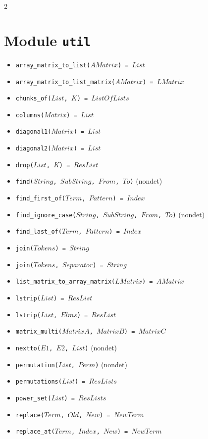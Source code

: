 \documentclass[10pt]{article}
\begin{document}
\begin{multicols}{2}
\section*{Module \texttt{util}}
\begin{scriptsize}
\begin{itemize}
    \item \texttt{array\_matrix\_to\_list($AMatrix$) = $List$}
    \item \texttt{array\_matrix\_to\_list\_matrix($AMatrix$) = $LMatrix$}
    \item \texttt{chunks\_of($List$, $K$) = $ListOfLists$}
    \item \texttt{columns($Matrix$) = $List$}
    \item \texttt{diagonal1($Matrix$) = $List$}
    \item \texttt{diagonal2($Matrix$) = $List$}
    \item \texttt{drop($List$, $K$) = $ResList$}
    \item \texttt{find($String$, $SubString$, $From$, $To$)} (nondet)
    \item \texttt{find\_first\_of($Term$, $Pattern$) = $Index$}
    \item \texttt{find\_ignore\_case($String$, $SubString$, $From$, $To$)} (nondet)
    \item \texttt{find\_last\_of($Term$, $Pattern$) = $Index$}
    \item \texttt{join($Tokens$) = $String$}
    \item \texttt{join($Tokens$, $Separator$) = $String$}
    \item \texttt{list\_matrix\_to\_array\_matrix($LMatrix$) = $AMatrix$} 
    \item \texttt{lstrip($List$) = $ResList$ }
    \item \texttt{lstrip($List$, $Elms$) = $ResList$ }
    \item \texttt{matrix\_multi($MatrixA$, $MatrixB$) = $MatrixC$}
    \item \texttt{nextto($E1$, $E2$, $List$)} (nondet)
    \item \texttt{permutation($List$, $Perm$)} (nondet)
    \item \texttt{permutations($List$) = $ResLists$}
    \item \texttt{power\_set($List$) = $ResLists$}
    \item \texttt{replace($Term$, $Old$, $New$) = $NewTerm$}
    \item \texttt{replace\_at($Term$, $Index$, $New$) = $NewTerm$}

\end{itemize}
\end{scriptsize}
\end{multicols}
\end{document}
